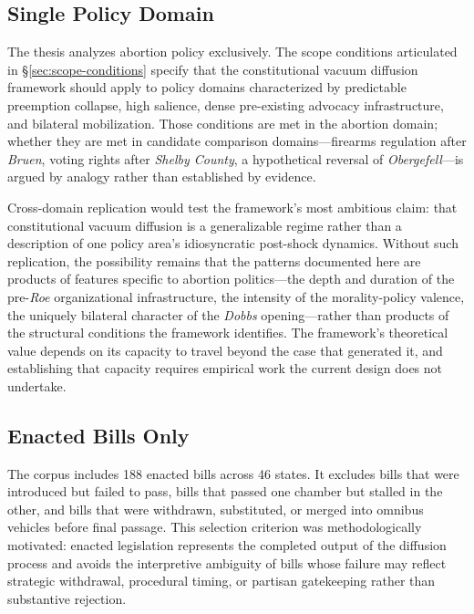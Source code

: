 \subsection{Single Policy Domain}
\label{subsec:single-domain}

The thesis analyzes abortion policy exclusively. The scope conditions articulated in \S\ref{sec:scope-conditions} specify that the constitutional vacuum diffusion framework should apply to policy domains characterized by predictable preemption collapse, high salience, dense pre-existing advocacy infrastructure, and bilateral mobilization. Those conditions are met in the abortion domain; whether they are met in candidate comparison domains---firearms regulation after \emph{Bruen}, voting rights after \emph{Shelby County}, a hypothetical reversal of \emph{Obergefell}---is argued by analogy rather than established by evidence.

Cross-domain replication would test the framework's most ambitious claim: that constitutional vacuum diffusion is a generalizable regime rather than a description of one policy area's idiosyncratic post-shock dynamics. Without such replication, the possibility remains that the patterns documented here are products of features specific to abortion politics---the depth and duration of the pre-\emph{Roe} organizational infrastructure, the intensity of the morality-policy valence, the uniquely bilateral character of the \emph{Dobbs} opening---rather than products of the structural conditions the framework identifies. The framework's theoretical value depends on its capacity to travel beyond the case that generated it, and establishing that capacity requires empirical work the current design does not undertake.

\subsection{Enacted Bills Only}
\label{subsec:enacted-only}

The corpus includes 188 enacted bills across 46 states. It excludes bills that were introduced but failed to pass, bills that passed one chamber but stalled in the other, and bills that were withdrawn, substituted, or merged into omnibus vehicles before final passage. This selection criterion was methodologically motivated: enacted legislation represents the completed output of the diffusion process and avoids the interpretive ambiguity of bills whose failure may reflect strategic withdrawal, procedural timing, or partisan gatekeeping rather than substantive rejection.


